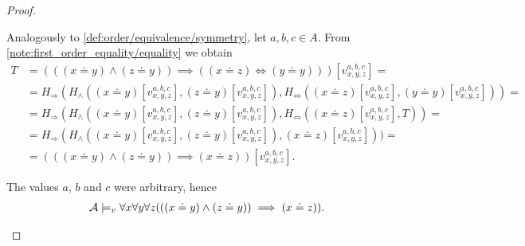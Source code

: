 \begin{proof}
\begin{description}
     Analogously to \ref{def:order/equivalence/symmetry}, let $a, b, c \in A$. From \cref{note:first_order_equality/equality} we obtain
    \begin{align*}
      T &=
      (((x \doteq y) \land (z \doteq y)) \implies ((x \doteq z) \iff (y \doteq y)))[v_{x,y,z}^{a,b,c}]
      = \\ &=
      H_\Rightarrow(H_\land((x \doteq y)[v_{x,y,z}^{a,b,c}], (z \doteq y)[v_{x,y,z}^{a,b,c}]), H_\Leftrightarrow((x \doteq z)[v_{x,y,z}^{a,b,c}], (y \doteq y)[v_{x,y,z}^{a,b,c}]))
      = \\ &=
      H_\Rightarrow(H_\land((x \doteq y)[v_{x,y,z}^{a,b,c}], (z \doteq y)[v_{x,y,z}^{a,b,c}]), H_\Leftrightarrow((x \doteq z)[v_{x,y,z}^{a,b,c}], T))
      = \\ &=
      H_\Rightarrow(H_\land((x \doteq y)[v_{x,y,z}^{a,b,c}], (z \doteq y)[v_{x,y,z}^{a,b,c}]), (x \doteq z)[v_{x,y,z}^{a,b,c}]))
      = \\ &=
      (((x \doteq y) \land (z \doteq y)) \implies (x \doteq z))[v_{x,y,z}^{a,b,c}].
    \end{align*}

    The values $a$, $b$ and $c$ were arbitrary, hence
    \begin{align*}
      \mathcal A \models_v \forall x \forall y \forall z (((x \doteq y) \land (z \doteq y)) \implies (x \doteq z)).
    \end{align*}
  \end{description}
\end{proof}
